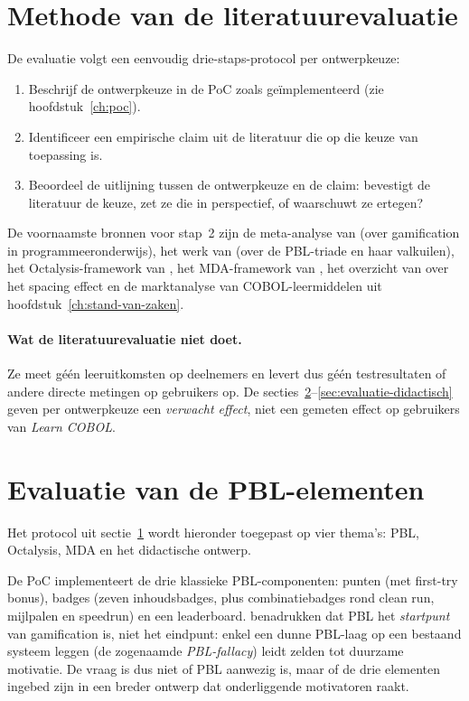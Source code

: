 \section{Methode van de literatuurevaluatie}
\label{sec:evaluatie-methode}

De evaluatie volgt een eenvoudig drie-staps-protocol per ontwerpkeuze:

\begin{enumerate}
    \item Beschrijf de ontwerpkeuze in de PoC zoals geïmplementeerd (zie hoofdstuk~\ref{ch:poc}).
    \item Identificeer een empirische claim uit de literatuur die op die keuze van toepassing is.
    \item Beoordeel de uitlijning tussen de ontwerpkeuze en de claim: bevestigt de literatuur de keuze, zet ze die in perspectief, of waarschuwt ze ertegen?
\end{enumerate}

De voornaamste bronnen voor stap~2 zijn de meta-analyse van \textcite{Zhan2022} (over gamification in programmeeronderwijs), het werk van \textcite{KevinWerbach2020} (over de PBL-triade en haar valkuilen), het Octalysis-framework van \textcite{Chou2015}, het MDA-framework van \textcite{Hunicke2004}, het overzicht van \textcite{Cepeda2006} over het spacing effect en de marktanalyse van COBOL-leermiddelen uit hoofdstuk~\ref{ch:stand-van-zaken}.


\paragraph{Wat de literatuurevaluatie niet doet.}
Ze meet géén leeruitkomsten op deelnemers en levert dus géén testresultaten of andere directe metingen op gebruikers op.
De secties~\ref{sec:evaluatie-pbl}--\ref{sec:evaluatie-didactisch} geven per ontwerpkeuze een \emph{verwacht effect}, niet een gemeten effect op gebruikers van \textit{Learn COBOL}.

\section{Evaluatie van de PBL-elementen}
\label{sec:evaluatie-pbl}

Het protocol uit sectie~\ref{sec:evaluatie-methode} wordt hieronder toegepast op vier thema's: PBL, Octalysis, MDA en het didactische ontwerp.

De PoC implementeert de drie klassieke PBL-componenten: punten (met first-try bonus), badges (zeven inhoudsbadges, plus combinatiebadges rond clean run, mijlpalen en speedrun) en een leaderboard. 
\textcite{KevinWerbach2020} benadrukken dat PBL het \emph{startpunt} van gamification is, niet het eindpunt: enkel een dunne PBL-laag op een bestaand systeem leggen (de zogenaamde \textit{PBL-fallacy}) leidt zelden tot duurzame motivatie. 
De vraag is dus niet of PBL aanwezig is, maar of de drie elementen ingebed zijn in een breder ontwerp dat onderliggende motivatoren raakt.

